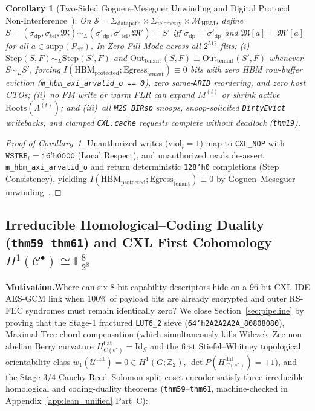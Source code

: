 \documentclass[11pt,letterpaper]{article}
\theoremstyle{spectralthm}
\newtheorem{corollary}[theorem]{Corollary}
\begin{document}
\begin{corollary}[Two-Sided Goguen--Meseguer Unwinding and Digital Protocol Non-Interference~\cite{goguen1982security}]
\label{cor:unwinding}
On $\mathcal{S} = \Sigma_{\mathrm{datapath}} \times \Sigma_{\mathrm{telemetry}} \times \mathcal{M}_{\mathrm{HBM}}$, define $S = (\sigma_{\mathrm{dp}}, \sigma_{\mathrm{tel}}, \mathfrak{M}) \sim_L (\sigma'_{\mathrm{dp}}, \sigma'_{\mathrm{tel}}, \mathfrak{M}') = S'$ iff $\sigma_{\mathrm{dp}} = \sigma'_{\mathrm{dp}}$ and $\mathfrak{M}[a] = \mathfrak{M}'[a]$ for all $a \in \mathrm{supp}(P_{\mathrm{eff}})$. In Zero-Fill Mode across all $2^{512}$ flits: (i)~$\mathrm{Step}(S, F) \sim_L \mathrm{Step}(S', F)$ and $\mathrm{Out}_{\mathrm{tenant}}(S, F) \equiv \mathrm{Out}_{\mathrm{tenant}}(S', F)$ whenever $S \sim_L S'$, forcing $I(\mathrm{HBM}_{\mathrm{protected}}; \mathrm{Egress}_{\mathrm{tenant}}) \equiv 0$ bits with zero HBM row-buffer eviction (\texttt{m\_hbm\_axi\_arvalid\_o == 0}), zero same-\texttt{ARID} reordering, and zero host CTOs; (ii)~no FM write or warm FLR can expand $M^{(t)}$ or shrink active $\mathrm{Roots}(\Lambda^{(t)})$; and (iii)~all \texttt{M2S\_BIRsp} snoops, snoop-solicited \texttt{DirtyEvict} writebacks, and clamped \texttt{CXL.cache} requests complete without deadlock (\texttt{thm19}).
\end{corollary}
\begin{proof}[Proof of Corollary~\ref{cor:unwinding}]
Unauthorized writes ($\mathrm{viol}_i = 1$) map to \texttt{CXL\_NOP} with $\texttt{WSTRB}_i = \texttt{16'h0000}$ (Local Respect), and unauthorized reads de-assert \texttt{m\_hbm\_axi\_arvalid\_o} and return deterministic \texttt{128'h0} completions (Step Consistency), yielding $I(\mathrm{HBM}_{\mathrm{protected}}; \mathrm{Egress}_{\mathrm{tenant}}) \equiv 0$ by Goguen--Meseguer unwinding~\cite{goguen1982security}.
\end{proof}

\subsection{Irreducible Homological--Coding Duality (\texttt{thm59}--\texttt{thm61}) and CXL First Cohomology $H^1(\mathcal{C}^\bullet) \cong \mathbb{F}_{2^8}^8$}
\label{sec:homological_coding_duality}

\noindent\textbf{Motivation.}\;Where can six 8-bit capability descriptors hide on a 96-bit CXL IDE AES-GCM link when $100\%$ of payload bits are already encrypted and outer RS-FEC syndromes must remain identically zero? We close Section~\ref{sec:pipeline} by proving that the Stage-1 fractured \texttt{LUT6\_2} sieve (\texttt{64'h2A2A2A2A\_80808080}), Maximal-Tree chord compensation (which simultaneously kills Wilczek--Zee non-abelian Berry curvature $H_{C(e^*)}^{\mathrm{flat}} = \mathrm{Id}_{\mathcal{G}}$ and the first Stiefel--Whitney topological orientability class $w_1(\mathcal{U}^{\mathrm{flat}}) = 0 \in H^1(G;\mathbb{Z}_2)$, $\det P(H_{C(e^*)}^{\mathrm{flat}}) = +1$), and the Stage-3/4 Cauchy Reed--Solomon split-coset encoder satisfy three irreducible homological and coding-duality theorems (\texttt{thm59}--\texttt{thm61}, machine-checked in Appendix~\ref{app:lean_unified} Part~C):
\end{document}
